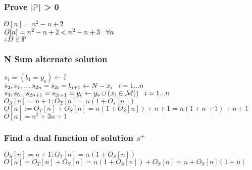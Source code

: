 \documentclass[11pt]{article}
\begin{document}
\subsubsection{Prove |$\mathbb{P}$| > 0}
\begin{center}
$
O[n] = n^2 - n + 2 
$
\\ \vspace{2mm}
$
O[n] = n^2 - n +2  < n^2 - n + 3 \hspace{3mm} \forall n
$
\\ \vspace{2mm}
$
\therefore D \in \mathbb{P}
$
\end{center}








\newpage
\subsubsection{N Sum alternate solution}
\begin{center}
\vspace{1.5mm}
$
s_1 = (b_1 = y_o) \leftarrow \mathbb{F}
$
\\ \vspace{2mm}
$
s_2,s_4,...,s_{2n} = s_{2i} =  b_{i+1} \leftarrow N - x_i \hspace{3mm} i = 1...n
$
\\ \vspace{2mm}
$
s_3,s_5 ... s_{2n+1} = s_{2i+1} = y_o \leftarrow y_o \cup (x_i \in \mathcal{M})) \hspace{3mm} i = 1...n
$
\\ \vspace{2mm}
$
O_S[n] = n + 1; O_T[n] = n(1 + O_s[n])
$
\\ \vspace{2mm}
$
O[n] := O_T[n] + O_S[n] = n(1 + O_S[n]) + n + 1 = n(1 + n + 1) + n + 1
$
\\ \vspace{2mm}
$
O[n] = n^2 + 3n + 1
$
\end{center}


\subsubsection{Find a dual function of solution $s^+$}
\begin{center}
$
O_S[n] = n + 1; O_T[n] = n(1 + O_S[n])
$
\\ \vspace{2mm}
$
O[n] = O_T[n] + O_S[n] = n(1 + O_S[n]) + O_S[n] = n + O_S[n](1+n)
$
\end{center}
\end{document}
